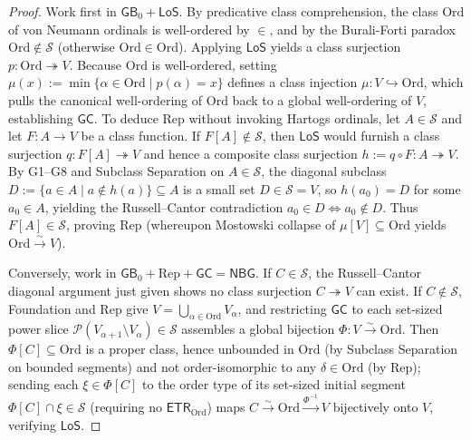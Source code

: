 \begin{proof}
Work first in $\mathsf{GB}_0 + \mathsf{LoS}$. By predicative class comprehension, the class $\mathrm{Ord}$ of von Neumann ordinals is well-ordered by $\in$, and by the Burali-Forti paradox $\mathrm{Ord} \notin \mathcal{S}$ (otherwise $\mathrm{Ord} \in \mathrm{Ord}$). Applying $\mathsf{LoS}$ yields a class surjection $p : \mathrm{Ord} \twoheadrightarrow V$. Because $\mathrm{Ord}$ is well-ordered, setting $\mu(x) := \min\{\alpha \in \mathrm{Ord} \mid p(\alpha) = x\}$ defines a class injection $\mu : V \hookrightarrow \mathrm{Ord}$, which pulls the canonical well-ordering of $\mathrm{Ord}$ back to a global well-ordering of $V$, establishing $\mathsf{GC}$. To deduce $\mathrm{Rep}$ without invoking Hartogs ordinals, let $A \in \mathcal{S}$ and let $F : A \to V$ be a class function. If $F[A] \notin \mathcal{S}$, then $\mathsf{LoS}$ would furnish a class surjection $q : F[A] \twoheadrightarrow V$ and hence a composite class surjection $h := q \circ F : A \twoheadrightarrow V$. By G1--G8 and Subclass Separation on $A \in \mathcal{S}$, the diagonal subclass $D := \{a \in A \mid a \notin h(a)\} \subseteq A$ is a small set $D \in \mathcal{S} = V$, so $h(a_0) = D$ for some $a_0 \in A$, yielding the Russell--Cantor contradiction $a_0 \in D \iff a_0 \notin D$. Thus $F[A] \in \mathcal{S}$, proving $\mathrm{Rep}$ (whereupon Mostowski collapse of $\mu[V] \subseteq \mathrm{Ord}$ yields $\mathrm{Ord} \xrightarrow{\sim} V$).

Conversely, work in $\mathsf{GB}_0 + \mathrm{Rep} + \mathsf{GC} = \mathsf{NBG}$. If $C \in \mathcal{S}$, the Russell--Cantor diagonal argument just given shows no class surjection $C \twoheadrightarrow V$ can exist. If $C \notin \mathcal{S}$, Foundation and $\mathrm{Rep}$ give $V = \bigcup_{\alpha \in \mathrm{Ord}} V_\alpha$, and restricting $\mathsf{GC}$ to each set-sized power slice $\mathcal{P}(V_{\alpha+1} \setminus V_\alpha) \in \mathcal{S}$ assembles a global bijection $\Phi : V \xrightarrow{\sim} \mathrm{Ord}$. Then $\Phi[C] \subseteq \mathrm{Ord}$ is a proper class, hence unbounded in $\mathrm{Ord}$ (by Subclass Separation on bounded segments) and not order-isomorphic to any $\delta \in \mathrm{Ord}$ (by $\mathrm{Rep}$); sending each $\xi \in \Phi[C]$ to the order type of its set-sized initial segment $\Phi[C] \cap \xi \in \mathcal{S}$ (requiring no $\mathsf{ETR}_{\mathrm{Ord}}$) maps $C \xrightarrow{\sim} \mathrm{Ord} \xrightarrow{\Phi^{-1}} V$ bijectively onto $V$, verifying $\mathsf{LoS}$.


\end{proof}
